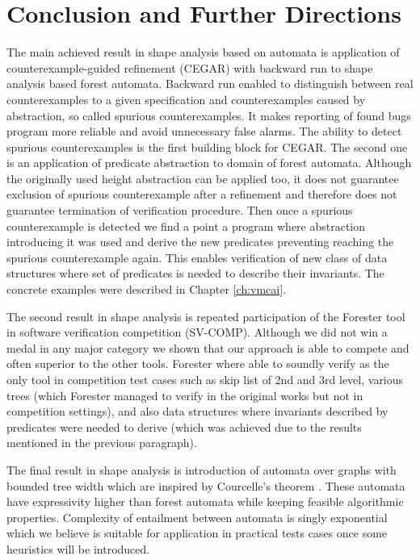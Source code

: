 {\chapter{Conclusion and Further Directions}
\label{ch:concl}
The main achieved result in shape analysis based on automata is
application of counterexample-guided refinement (CEGAR) with backward run to shape
analysis based forest automata.
Backward run enabled to distinguish between real counterexamples to a given
specification and counterexamples caused by abstraction, so called spurious
counterexamples.
It makes reporting of found bugs program more reliable and avoid unnecessary
false alarms.
The ability to detect spurious counterexamples is the first building block
for CEGAR.
The second one is an application of predicate abstraction to domain of forest automata.
Although the originally used height abstraction can be applied too, it does not guarantee
exclusion of spurious counterexample after a refinement and therefore does not guarantee
termination of verification procedure.
Then once a spurious counterexample is detected we find a point a program where abstraction
introducing it was used and derive the new predicates preventing
reaching the spurious counterexample again.
This enables verification of new class of data structures where set of predicates
is needed to describe their invariants.
The concrete examples were described in Chapter \ref{ch:vmcai}.

The second result in shape analysis is repeated participation of the Forester
tool in software verification competition (SV-COMP).
Although we did not win a medal in any major category we shown that our approach
is able to compete and often superior to the other tools.
Forester where able to soundly verify as the only tool in competition test cases
such as skip list of 2nd and 3rd level, various trees (which Forester managed to
verify in the original works \cite{boxes13} but not in competition settings),
and also data structures where invariants described by predicates were needed to derive
(which was achieved due to the results mentioned in the previous paragraph).

The final result in shape analysis is introduction of automata over graphs
with bounded tree width which are inspired by Courcelle's theorem \cite{courcell_graph_2012}.
These automata have expressivity higher than forest automata while keeping
feasible algorithmic properties.
Complexity of entailment between automata is singly exponential which we believe
is suitable for application in practical tests cases once some heuristics will be introduced.

}
